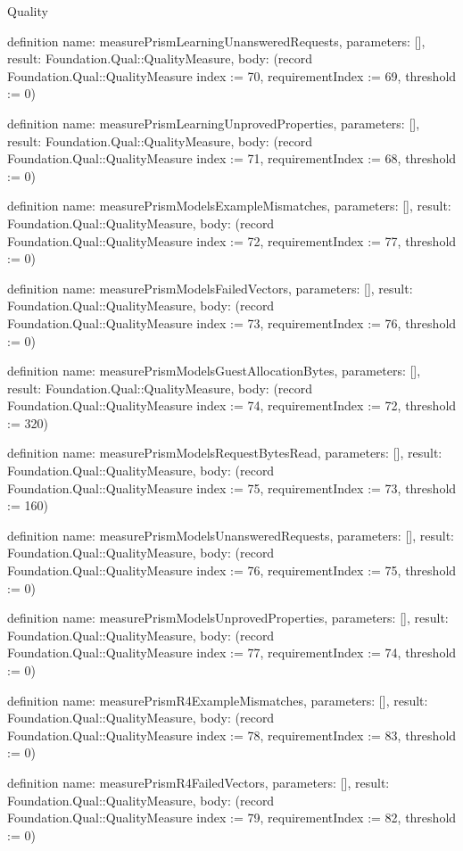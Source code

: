 \begin{lexlean}{Quality}
\begin{semanticmodule}
definition{
  name: measurePrismLearningUnansweredRequests,
  parameters: [],
  result: Foundation.Qual::QualityMeasure,
  body: (record Foundation.Qual::QualityMeasure {index := 70, requirementIndex := 69, threshold := 0})
}

definition{
  name: measurePrismLearningUnprovedProperties,
  parameters: [],
  result: Foundation.Qual::QualityMeasure,
  body: (record Foundation.Qual::QualityMeasure {index := 71, requirementIndex := 68, threshold := 0})
}

definition{
  name: measurePrismModelsExampleMismatches,
  parameters: [],
  result: Foundation.Qual::QualityMeasure,
  body: (record Foundation.Qual::QualityMeasure {index := 72, requirementIndex := 77, threshold := 0})
}

definition{
  name: measurePrismModelsFailedVectors,
  parameters: [],
  result: Foundation.Qual::QualityMeasure,
  body: (record Foundation.Qual::QualityMeasure {index := 73, requirementIndex := 76, threshold := 0})
}

definition{
  name: measurePrismModelsGuestAllocationBytes,
  parameters: [],
  result: Foundation.Qual::QualityMeasure,
  body: (record Foundation.Qual::QualityMeasure {index := 74, requirementIndex := 72, threshold := 320})
}

definition{
  name: measurePrismModelsRequestBytesRead,
  parameters: [],
  result: Foundation.Qual::QualityMeasure,
  body: (record Foundation.Qual::QualityMeasure {index := 75, requirementIndex := 73, threshold := 160})
}

definition{
  name: measurePrismModelsUnansweredRequests,
  parameters: [],
  result: Foundation.Qual::QualityMeasure,
  body: (record Foundation.Qual::QualityMeasure {index := 76, requirementIndex := 75, threshold := 0})
}

definition{
  name: measurePrismModelsUnprovedProperties,
  parameters: [],
  result: Foundation.Qual::QualityMeasure,
  body: (record Foundation.Qual::QualityMeasure {index := 77, requirementIndex := 74, threshold := 0})
}

definition{
  name: measurePrismR4ExampleMismatches,
  parameters: [],
  result: Foundation.Qual::QualityMeasure,
  body: (record Foundation.Qual::QualityMeasure {index := 78, requirementIndex := 83, threshold := 0})
}

definition{
  name: measurePrismR4FailedVectors,
  parameters: [],
  result: Foundation.Qual::QualityMeasure,
  body: (record Foundation.Qual::QualityMeasure {index := 79, requirementIndex := 82, threshold := 0})
}


\end{semanticmodule}
\end{lexlean}
